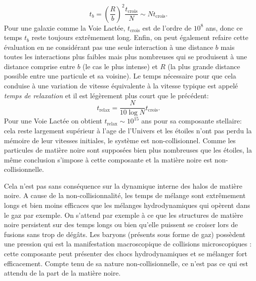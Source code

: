 \begin{equation}
t_b=\left(\frac{R}{b}\right)^2 \frac{t_\mathrm{crois}}{N}\sim N t_\mathrm{crois}.
\end{equation}
Pour une galaxie comme la Voie Lactée, $t_\mathrm{crois}$ est de l'ordre de $10^8$ ans, donc ce temps $t_b$ reste toujours extrêmement long. Enfin, on peut également refaire cette évaluation en ne considérant pas une seule interaction à une distance $b$ mais toutes les interactions plus faibles mais plus nombreuses qui se produisent à une distance comprise entre $b$ (le cas le plus intense) et $R$ (la plus grande distance possible entre une particule et sa voisine). Le temps nécessaire pour que cela conduise à une variation de vitesse équivalente à la vitesse typique est appelé \textit{temps de relaxation} et il est légèrement plus court que le précédent:
\begin{equation}
t_\mathrm{relax}=\frac{N}{10\log N} t_\mathrm{crois}.
\end{equation}
Pour une Voie Lactée on obtient $t_\mathrm{relax} \sim 10^{15}$ ans pour sa composante stellaire: cela reste largement supérieur à l'age de l'Univers et les étoiles n'ont pas perdu la mémoire de leur vitesses initiales, le système est non-collisionnel. Comme les particules de matière noire sont supposées bien plus nombreuses que les étoiles, la même conclusion s'impose à cette composante et la matière noire est non-collisionnelle.

Cela n'est pas sans conséquence sur la dynamique interne des halos de matière noire. A cause de la non-collisionnalité, les temps de mélange sont extrêmement longs et bien moins efficaces que les mélanges hydrodynamiques qui opèrent dans le gaz par exemple. On s'attend par exemple à ce que les structures de matière noire persistent sur des temps longs ou bien qu'elle puissent se croiser lors de fusions sans trop de dégâts. Les baryons (présents sous forme de gaz) possèdent une pression qui est la manifestation macroscopique de collisions microscopiques : cette composante peut présenter des chocs hydrodynamiques et se mélanger fort efficacement. Compte tenu de sa nature non-collisionnelle, ce n'est pas ce qui est attendu de la part de la matière noire.



